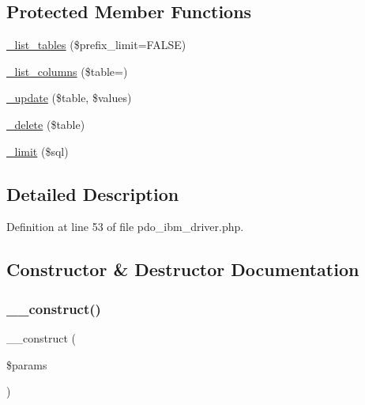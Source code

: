 \subsection*{Protected Member Functions}
\begin{DoxyCompactItemize}
\item 
\mbox{\hyperlink{class_c_i___d_b__pdo__ibm__driver_a435c0f3ce54fe7daa178baa8532ebd54}{\+\_\+list\+\_\+tables}} (\$prefix\+\_\+limit=F\+A\+L\+SE)
\item 
\mbox{\hyperlink{class_c_i___d_b__pdo__ibm__driver_a7ccb7f9c301fe7f0a9db701254142b63}{\+\_\+list\+\_\+columns}} (\$table=\textquotesingle{}\textquotesingle{})
\item 
\mbox{\hyperlink{class_c_i___d_b__pdo__ibm__driver_a2540b03a93fa73ae74c10d0e16fc073e}{\+\_\+update}} (\$table, \$values)
\item 
\mbox{\hyperlink{class_c_i___d_b__pdo__ibm__driver_a133ea8446ded52589bd22cc9163d0896}{\+\_\+delete}} (\$table)
\item 
\mbox{\hyperlink{class_c_i___d_b__pdo__ibm__driver_a3a02ea06541b8ecc25a33a61651562c8}{\+\_\+limit}} (\$sql)
\end{DoxyCompactItemize}


\subsection{Detailed Description}


Definition at line 53 of file pdo\+\_\+ibm\+\_\+driver.\+php.



\subsection{Constructor \& Destructor Documentation}
\mbox{\label{class_c_i___d_b__pdo__ibm__driver_a9162320adff1a1a4afd7f2372f753a3e}} 
\subsubsection{\texorpdfstring{\_\_construct()}{\_\_construct()}}
{\footnotesize\ttfamily \+\_\+\+\_\+construct (\begin{DoxyParamCaption}\item[{}]{\$params }\end{DoxyParamCaption})}

